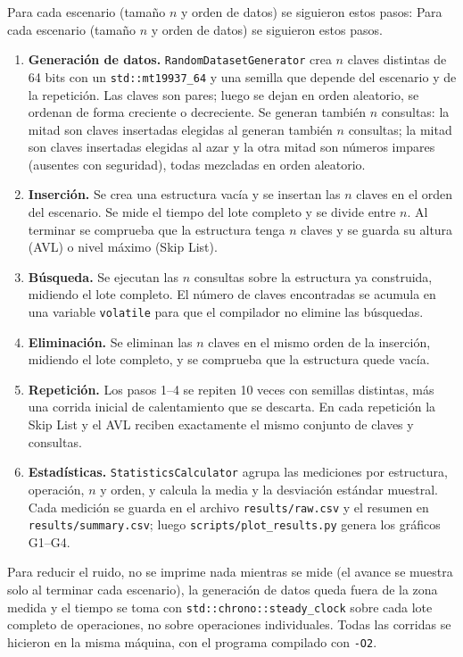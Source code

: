 \documentclass[11pt,a4paper]{article}
\begin{document}
Para cada escenario (tamaño $n$ y orden de datos) se siguieron estos pasos:
Para cada escenario (tamaño $n$ y orden de datos) se siguieron estos pasos.
\begin{enumerate}
  \item \textbf{Generación de datos.} \texttt{RandomDatasetGenerator} crea $n$
  claves distintas de 64 bits con un \texttt{std::mt19937\_64} y una semilla
  que depende del escenario y de la repetición. Las claves son pares; luego se
  dejan en orden aleatorio, se ordenan de forma creciente o decreciente. Se
  generan también $n$ consultas: la mitad son claves insertadas elegidas al
  generan también $n$ consultas; la mitad son claves insertadas elegidas al
  azar y la otra mitad son números impares (ausentes con seguridad), todas
  mezcladas en orden aleatorio.
  \item \textbf{Inserción.} Se crea una estructura vacía y se insertan las $n$
  claves en el orden del escenario. Se mide el tiempo del lote completo y se
  divide entre $n$. Al terminar se comprueba que la estructura tenga $n$
  claves y se guarda su altura (AVL) o nivel máximo (Skip List).
  \item \textbf{Búsqueda.} Se ejecutan las $n$ consultas sobre la estructura
  ya construida, midiendo el lote completo. El número de claves encontradas
  se acumula en una variable \texttt{volatile} para que el compilador no
  elimine las búsquedas.
  \item \textbf{Eliminación.} Se eliminan las $n$ claves en el mismo orden de
  la inserción, midiendo el lote completo, y se comprueba que la estructura
  quede vacía.
  \item \textbf{Repetición.} Los pasos 1--4 se repiten 10 veces con semillas
  distintas, más una corrida inicial de calentamiento que se descarta. En
  cada repetición la Skip List y el AVL reciben exactamente el mismo conjunto
  de claves y consultas.
  \item \textbf{Estadísticas.} \texttt{StatisticsCalculator} agrupa las
  mediciones por estructura, operación, $n$ y orden, y calcula la media y la
  desviación estándar muestral. Cada medición se guarda en el archivo
  \texttt{results/raw.csv} y el resumen en \texttt{results/summary.csv};
  luego \texttt{scripts/plot\_results.py} genera los gráficos G1--G4.
\end{enumerate}

Para reducir el ruido, no se imprime nada mientras se mide (el avance se
muestra solo al terminar cada escenario), la generación de datos queda fuera
de la zona medida y el tiempo se toma con
\texttt{std::chrono::steady\_clock} sobre cada lote completo de operaciones,
no sobre operaciones individuales. Todas las corridas se hicieron en la misma
máquina, con el programa compilado con \texttt{-O2}.
\end{document}
